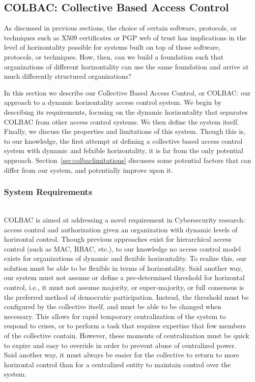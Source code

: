 \subsection{COLBAC: Collective Based Access Control}
\label{sec:colbac}
As discussed in previous sections, the choice of certain software, protocols, or
techniques such as X509 certificates or PGP web of trust has implications in the
level of horizontality possible for systems built on top of those software,
protocols, or techniques. How, then, can we build a foundation such that
organizations of different horizontality can use the same foundation and arrive
at much differently structured organizations?

In this section we describe our Collective Based Access Control, or COLBAC: our
approach to a dynamic horizontality access control system. We begin by
describing its requirements, focusing on the dynamic horizontality that
separates COLBAC from other access control systems. We then define the system
itself. Finally, we discuss the properties and limitations of this system.
Though this is, to our knowledge, the first attempt at defining a collective
based access control system with dynamic and felxible horizontality, it is far
from the only potential approach. Section~\ref{sec:colbaclimitations} discusses
some potential factors that can differ from our system, and potentially improve
upon it.

\subsubsection{System Requirements}
\label{sec:colbacrequirements}
\mbox{}\\
COLBAC is aimed at addressing a novel requirement in Cybersecurity research:
access control and authorization given an organization with dynamic levels of
horizontal control. Though previous approaches exist for hierarchical access
control (such as MAC, RBAC, etc.), to our knowledge no access control model
exists for organizations of dynamic and flexible horizontality. To realize
this, our solution must be able to be flexible in terms of horizontality. Said
another way, our system must not assume or define a pre-determined threshold for
horizontal control, i.e., it must not assume majority, or super-majority, or
full consensus is the preferred method of democratic participation. Instead,
the threshold must be configured by the collective itself, and must be able to
be changed when necessary. This allows for rapid temporary centralization of the
system to respond to crises, or to perform a task that requires expertise that
few members of the collective contain. However, these moments of centralization
must be quick to expire and easy to override in order to prevent abuse of
centralized power. Said another way, it must always be easier for the collective
to return to more horizontal control than for a centralized entity to maintain
control over the system.

